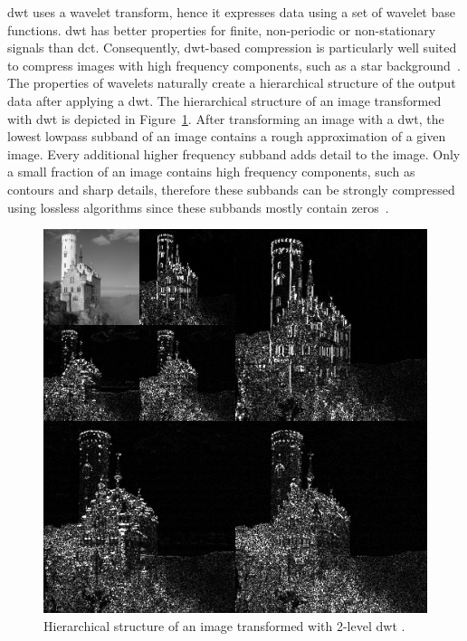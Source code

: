 \Gls{dwt} uses a wavelet transform, hence it expresses data using a set of wavelet base functions. \Gls{dwt} has better properties for finite, non-periodic or non-stationary signals than \gls{dct}. Consequently, \gls{dwt}-based compression is particularly well suited to compress images with high frequency components, such as a star background~\cite{Bocharova2009CompressionMultimedia}. The properties of wavelets naturally create a hierarchical structure of the output data after applying a \gls{dwt}. The hierarchical structure of an image transformed with \gls{dwt} is depicted in Figure~\ref{fig:jp2_hierarchy}. After transforming an image with a \gls{dwt}, the lowest lowpass subband of an image contains a rough approximation of a given image. Every additional higher frequency subband adds detail to the image. Only a small fraction of an image contains high frequency components, such as contours and sharp details, therefore these subbands can be strongly compressed using lossless algorithms since these subbands mostly contain zeros~\cite{Bocharova2009CompressionMultimedia}.
\begin{figure}[htb]
    \centering
        \includegraphics[width=.7\textwidth]{doc/thesis/0_figures/jp2_jpeg/Jpeg2000_2-level_wavelet_transform-lichtenstein.png}
        \caption{Hierarchical structure of an image transformed with 2-level \gls{dwt} \cite{Commons20192-levelTransform-lichtenstein}.}
        \label{fig:jp2_hierarchy}
\end{figure}

